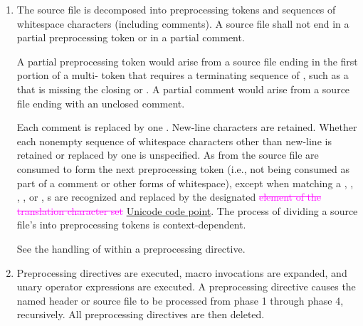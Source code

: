 \documentclass{wg21}
\newcommand{\addedTranslation}[1]{\textcolor{addclrTwo}{\uline{#1}}}
\newcommand{\removedTranslation}[1]{\textcolor{magenta}{\sout{#1}}}
\newcommand{\changedTranslation}[2]{\removedTranslation{#1} \addedTranslation{#2}}
\begin{document}
\begin{enumerate}
    \item The source file is decomposed into preprocessing
    tokens and sequences of whitespace characters
    (including comments). A source file shall not end in a partial
    preprocessing token or in a partial comment.
    \begin{wfootnote}
        A partial preprocessing
        token would arise from a source file
        ending in the first portion of a multi- token that requires a
        terminating sequence of , such as a 
        that is missing the closing 
        or \tcode{>}. A partial comment
        would arise from a source file ending with an unclosed \tcode{/*}
        comment.
    \end{wfootnote}
    Each comment is replaced by one . New-line characters are
    retained. Whether each nonempty sequence of whitespace characters other
    than new-line is retained or replaced by one  is
    unspecified.
    As  from the source file are consumed
    to form the next preprocessing token
    (i.e., not being consumed as part of a comment or other forms of whitespace),
    except when matching a
    ,
    ,
    ,
    , or
    ,
    s are recognized and
    replaced by the designated \changedTranslation{element of the translation character set}{Unicode code point}.
    The process of dividing a source file's
     into preprocessing tokens is context-dependent.
    \begin{example}
        See the handling of \tcode{<} within a  preprocessing
        directive.
    \end{example}

    \item Preprocessing directives are executed, macro invocations are
    expanded, and  unary operator expressions are executed.
    A  preprocessing directive causes the named header or
    source file to be processed from phase 1 through phase 4, recursively.
    All preprocessing directives are then deleted.


\end{enumerate}
\end{document}
